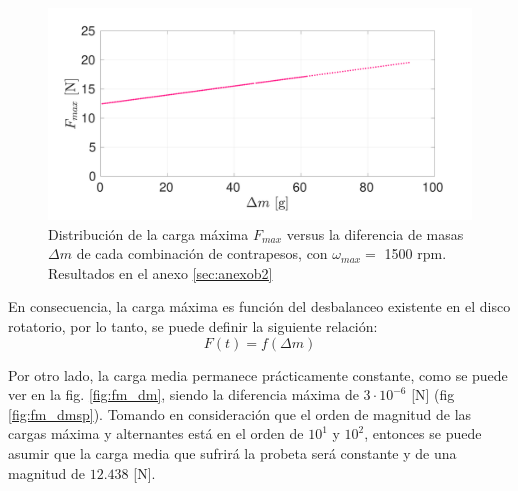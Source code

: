 \begin{figure}[h]
\centering
\includegraphics[width=\linewidth, trim={0cm 0cm 2cm 0cm},clip]{Imagenes/fmax_dm_25.pdf}
\caption{Distribución de la carga máxima $F_{max}$ versus la diferencia de masas $\Delta m$ de cada combinación de contrapesos, con $\omega_{max} =$ 1500 rpm. Resultados en el anexo \ref{sec:anexob2}}
\label{fig:fmax_dm25}
\end{figure}

En consecuencia, la carga máxima es función del desbalanceo existente en el disco rotatorio, por lo tanto, se puede definir la siguiente relación: 
\begin{equation}\label{eq:func_dm}
	F(t) = f(\Delta m)
\end{equation}

Por otro lado, la carga media permanece prácticamente constante, como se puede ver en la fig. \ref{fig:fm_dm}, siendo la diferencia máxima de $3\cdot10^{-6}$ [N] (fig \ref{fig:fm_dmsp}). Tomando en consideración que el orden de magnitud de las cargas máxima y alternantes está en el orden de $10^1$ y $10^2$, entonces se puede asumir que la carga media que sufrirá la probeta será constante y de una magnitud de $12.438$ [N]. 

